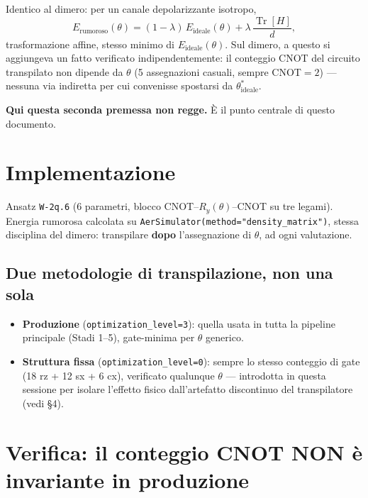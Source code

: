 \documentclass[11pt,a4paper]{article}
\providecommand{\Tr}{\operatorname{Tr}}
\begin{document}
Identico al dimero: per un canale depolarizzante isotropo,
$$E_\text{rumoroso}(\theta) = (1-\lambda)\,E_\text{ideale}(\theta) + \lambda\,\frac{\Tr[H]}{d},$$
trasformazione affine, stesso minimo di $E_\text{ideale}(\theta)$. Sul dimero, a questo si
aggiungeva un fatto verificato indipendentemente: il conteggio CNOT del circuito transpilato
non dipende da $\theta$ (5 assegnazioni casuali, sempre CNOT$=2$) --- nessuna via indiretta per
cui convenisse spostarsi da $\theta^*_\text{ideale}$.

\textbf{Qui questa seconda premessa non regge.} È il punto centrale di questo documento.

\section{Implementazione}

Ansatz \texttt{W-2q.6} (6 parametri, blocco CNOT--$R_y(\theta)$--CNOT su tre legami). Energia
rumorosa calcolata su \texttt{AerSimulator(method="density\_matrix")}, stessa disciplina del
dimero: transpilare \textbf{dopo} l'assegnazione di $\theta$, ad ogni valutazione.

\subsection{Due metodologie di transpilazione, non una sola}

\begin{itemize}[nosep]
  \item \textbf{Produzione} (\texttt{optimization\_level=3}): quella usata in tutta la pipeline
  principale (Stadi 1--5), gate-minima per $\theta$ generico.
  \item \textbf{Struttura fissa} (\texttt{optimization\_level=0}): sempre lo stesso conteggio di
  gate (18 rz + 12 sx + 6 cx), verificato qualunque $\theta$ --- introdotta in questa sessione
  per isolare l'effetto fisico dall'artefatto discontinuo del transpilatore (vedi \S4).
\end{itemize}

\section{Verifica: il conteggio CNOT NON è invariante in produzione}
\end{document}

